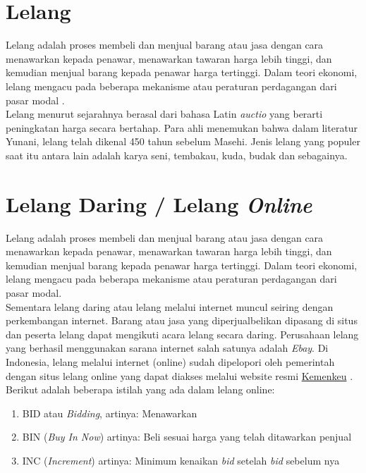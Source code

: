 	\section{  Lelang}
	Lelang adalah proses membeli dan menjual barang atau jasa dengan cara menawarkan kepada penawar, menawarkan tawaran harga lebih tinggi, dan kemudian menjual barang kepada penawar harga tertinggi. Dalam teori ekonomi, lelang mengacu pada beberapa mekanisme atau peraturan perdagangan dari pasar modal \cite{balailelang_sejarah_nodate}.
	\\ \indent
	Lelang menurut sejarahnya berasal dari bahasa Latin \textit{auctio} yang berarti peningkatan harga secara bertahap. Para ahli menemukan bahwa dalam literatur Yunani, lelang telah dikenal 450 tahun sebelum Masehi. Jenis lelang yang populer saat itu antara lain adalah karya seni, tembakau, kuda, budak dan sebagainya\cite{pratama_lelang_2012}.
	   
	\section{  Lelang Daring / Lelang \textit{Online}}
	Lelang adalah proses membeli dan menjual barang atau jasa dengan cara menawarkan kepada penawar, menawarkan tawaran harga lebih tinggi, dan kemudian menjual barang kepada penawar harga tertinggi. Dalam teori ekonomi, lelang mengacu pada beberapa mekanisme atau peraturan perdagangan dari pasar modal. \\
	Sementara lelang daring atau lelang melalui internet muncul seiring dengan perkembangan internet. Barang atau jasa yang diperjualbelikan dipasang di situs dan peserta lelang dapat mengikuti acara lelang secara daring. Perusahaan lelang yang berhasil menggunakan sarana internet salah satunya adalah \textit{Ebay}. Di Indonesia, lelang melalui internet (online) sudah dipelopori oleh pemerintah dengan situs lelang online yang dapat diakses melalui website resmi \href{https://www.lelangdjkn.kemenkeu.go.id}{Kemenkeu} \cite{wikipedia_lelang_2016}. 
	Berikut adalah beberapa istilah yang ada dalam lelang online:
	\begin{enumerate}
	      	\item BID atau \textit{Bidding}, artinya: Menawarkan
	      	\item BIN (\textit{Buy In Now}) artinya: Beli sesuai harga yang telah ditawarkan penjual
	      	\item INC (\textit{Increment}) artinya: Minimum kenaikan \textit{bid} setelah \textit{bid} sebelum nya \cite{noauthor_arti_nodate}
	\end{enumerate}

